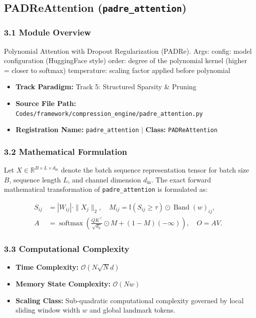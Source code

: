 \subsection{PADReAttention (\texttt{padre\_attention})}
\label{sec:app_module_padre\_attention}

\subsubsection*{3.1 Module Overview}
Polynomial Attention with Dropout Regularization (PADRe).  Args:     config: model configuration (HuggingFace style)     order: degree of the polynomial kernel (higher = closer to softmax)     temperature: scaling factor applied before polynomial
\begin{itemize}
    \item \textbf{Track Paradigm:} Track 5: Structured Sparsity & Pruning
    \item \textbf{Source File Path:} \texttt{Codes/framework/compression\_engine/padre\_attention.py}
    \item \textbf{Registration Name:} \texttt{padre\_attention} $\mid$ \textbf{Class:} \texttt{PADReAttention}
\end{itemize}

\subsubsection*{3.2 Mathematical Formulation}
Let $X \in \mathbb{R}^{B \times L \times d_{\text{in}}}$ denote the batch sequence representation tensor for batch size $B$, sequence length $L$, and channel dimension $d_{\text{in}}$. The exact forward mathematical transformation of \texttt{padre\_attention} is formulated as:

\begin{align}
S_{ij} &= |W_{ij}| \cdot \|X_j\|_2, \quad M_{ij} = \mathbb{I}(S_{ij} \ge \tau) \odot \operatorname{Band}(w)_{ij}, \\
A &= \operatorname{softmax}\left(\frac{Q K^\top}{\sqrt{d_k}} \odot M + (1 - M)(-\infty)\right), \quad O = A V.
\end{align}


\subsubsection*{3.3 Computational Complexity}
\begin{itemize}
    \item \textbf{Time Complexity:} $\mathcal{O}(N \sqrt{N} d)$
    \item \textbf{Memory State Complexity:} $\mathcal{O}(N w)$
    \item \textbf{Scaling Class:} Sub-quadratic computational complexity governed by local sliding window width $w$ and global landmark tokens.
\end{itemize}

